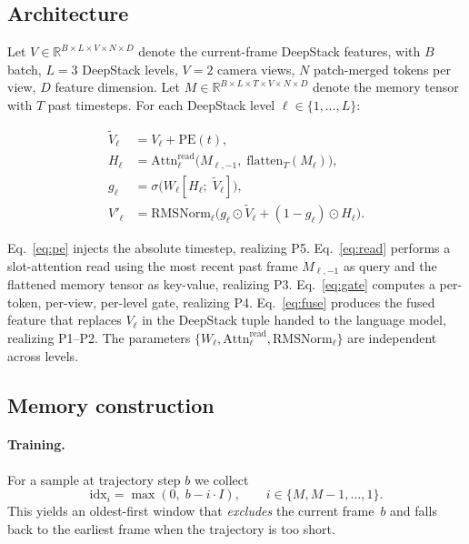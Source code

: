 \documentclass[11pt]{article}
\begin{document}
\subsection{Architecture}
\label{sec:arch}

Let $V \in \mathbb{R}^{B \times L \times V \times N \times D}$ denote the
current-frame DeepStack features, with $B$ batch, $L{=}3$ DeepStack levels,
$V{=}2$ camera views, $N$ patch-merged tokens per view, $D$ feature dimension.
Let $M \in \mathbb{R}^{B \times L \times T \times V \times N \times D}$ denote
the memory tensor with $T$ past timesteps. For each DeepStack level
$\ell \in \{1,\dots,L\}$:

\begin{align}
\widetilde{V}_\ell &= V_\ell + \mathrm{PE}(t),                              \label{eq:pe}\\
H_\ell            &= \mathrm{Attn}_\ell^{\mathrm{read}}\!\big(M_{\ell,-1},\;
                      \mathrm{flatten}_T(M_\ell)\big),                      \label{eq:read}\\
g_\ell            &= \sigma\!\big(W_\ell [H_\ell ;\; \widetilde{V}_\ell]\big), \label{eq:gate}\\
V'_\ell           &= \mathrm{RMSNorm}_\ell\!\big(g_\ell \odot \widetilde{V}_\ell
                      + (1-g_\ell) \odot H_\ell\big).                        \label{eq:fuse}
\end{align}

Eq.~\eqref{eq:pe} injects the absolute timestep, realizing P5.
Eq.~\eqref{eq:read} performs a slot-attention read using the most recent past
frame $M_{\ell,-1}$ as query and the flattened memory tensor as key-value,
realizing P3. Eq.~\eqref{eq:gate} computes a per-token, per-view, per-level
gate, realizing P4. Eq.~\eqref{eq:fuse} produces the fused feature that replaces
$V_\ell$ in the DeepStack tuple handed to the language model, realizing P1--P2.
The parameters $\{W_\ell, \mathrm{Attn}_\ell^{\mathrm{read}}, \mathrm{RMSNorm}_\ell\}$
are independent across levels.

\subsection{Memory construction}
\label{sec:memconstr}

\paragraph{Training.} For a sample at trajectory step $b$ we collect
\[
\mathrm{idx}_i = \max(0,\; b - i \cdot I),\qquad i \in \{M, M{-}1, \dots, 1\}.
\]
This yields an oldest-first window that \emph{excludes} the current frame~$b$
and falls back to the earliest frame when the trajectory is too short.
\end{document}
